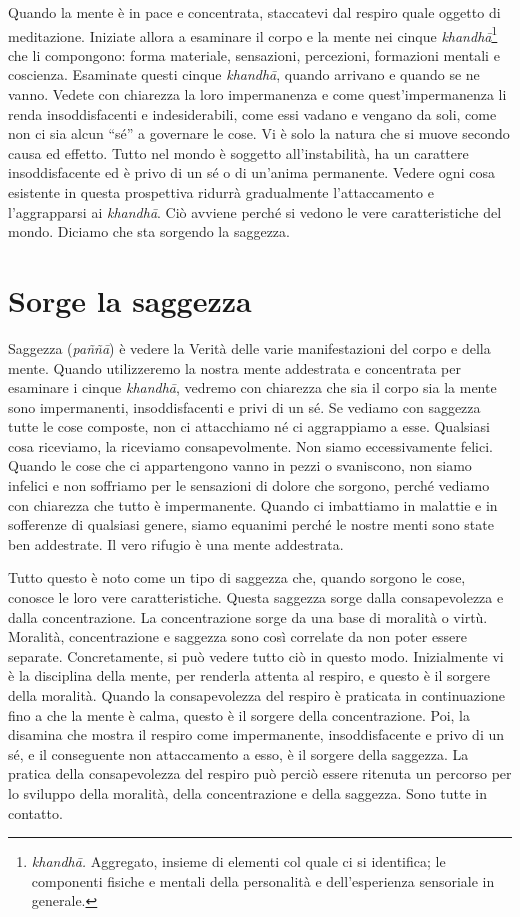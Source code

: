 Quando la mente è in pace e concentrata, staccatevi dal respiro quale
oggetto di meditazione. Iniziate allora a esaminare il corpo e la mente
nei cinque \emph{khandhā}\footnote{\emph{khandhā.} Aggregato, insieme di
  elementi col quale ci si identifica; le componenti fisiche e mentali
  della personalità e dell'esperienza sensoriale in generale.} che li
compongono: forma materiale, sensazioni, percezioni, \mbox{formazioni} mentali
e coscienza. Esaminate questi cinque \emph{khandhā}, quando arrivano e
quando se ne vanno. Vedete con chiarezza la loro impermanenza e come
quest'impermanenza li renda insoddisfacenti e indesiderabili, come essi
vadano e vengano da soli, come non ci sia alcun ``sé'' a governare le
cose. Vi è solo la natura che si muove secondo causa ed effetto. Tutto
nel mondo è soggetto all'instabilità, ha un carattere insoddisfacente ed
è privo di un sé o di un'anima permanente. Vedere ogni cosa esistente in
questa prospettiva ridurrà gradualmente l'attaccamento e l'aggrapparsi
ai \emph{khandhā}. Ciò avviene perché si vedono le vere caratteristiche
del mondo. Diciamo che sta sorgendo la saggezza.

\section{Sorge la saggezza}

Saggezza (\emph{paññā}) è vedere la Verità delle varie manifestazioni
del corpo e della mente. Quando utilizzeremo la nostra mente addestrata
e concentrata per esaminare i cinque \emph{khandhā}, vedremo con
chiarezza che sia il corpo sia la mente sono impermanenti,
insoddisfacenti e privi di un sé. Se vediamo con saggezza tutte le cose
composte, non ci attacchiamo né ci aggrappiamo a esse. Qualsiasi cosa
riceviamo, la riceviamo consapevolmente. Non siamo eccessivamente
felici. Quando le cose che ci appartengono vanno in pezzi o svaniscono,
non siamo infelici e non soffriamo per le sensazioni di dolore che
sorgono, perché vediamo con chiarezza che tutto è impermanente. Quando
ci imbattiamo in malattie e in sofferenze di qualsiasi genere, siamo
equanimi perché le nostre menti sono state ben addestrate. Il vero
rifugio è una mente addestrata.

Tutto questo è noto come un tipo di saggezza che, quando sorgono le
cose, conosce le loro vere caratteristiche. Questa saggezza sorge dalla
consapevolezza e dalla concentrazione. La concentrazione sorge da una
base di moralità o virtù. Moralità, concentrazione e saggezza sono così
correlate da non poter essere separate. Concretamente, si può vedere
tutto ciò in questo modo. Inizialmente vi è la disciplina della mente,
per renderla attenta al respiro, e questo è il sorgere della moralità.
Quando la consapevolezza del respiro è praticata in continuazione fino a
che la mente è calma, questo è il sorgere della concentrazione. Poi, la
disamina che mostra il respiro come impermanente, insoddisfacente e
privo di un sé, e il conseguente non attaccamento a esso, è il sorgere
della saggezza. La pratica della consapevolezza del respiro può perciò
essere ritenuta un percorso per lo sviluppo della moralità, della
concentrazione e della saggezza. Sono tutte in contatto.

